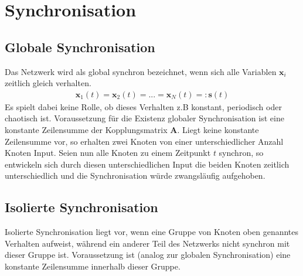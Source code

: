 \section{Synchronisation}
\subsection*{Globale Synchronisation}
Das Netzwerk wird als global synchron bezeichnet, wenn sich alle Variablen $\boldsymbol{x}_i$ zeitlich gleich verhalten.
\begin{align*}
\boldsymbol{x}_1(t)=\boldsymbol{x}_2(t)=...=\boldsymbol{x}_N(t)=:\boldsymbol{s}(t)
\end{align*}
Es spielt dabei keine Rolle, ob dieses Verhalten z.B konstant, periodisch oder chaotisch ist.
Voraussetzung für die Existenz globaler Synchronisation ist eine konstante Zeilensumme der Kopplungsmatrix $\boldsymbol{A}$. Liegt keine konstante Zeilensumme vor, so erhalten zwei Knoten von einer unterschiedlicher Anzahl Knoten Input. Seien nun alle Knoten zu einem Zeitpunkt $t$ synchron, so entwickeln sich durch diesen unterschiedlichen Input die beiden Knoten zeitlich unterschiedlich und die Synchronisation würde zwangsläufig aufgehoben.
\subsection*{Isolierte Synchronisation}
Isolierte Synchronisation liegt vor, wenn eine Gruppe von Knoten oben genanntes Verhalten aufweist, während ein anderer Teil des Netzwerks nicht synchron mit dieser Gruppe ist. Voraussetzung ist (analog zur globalen Synchronisation) eine konstante Zeilensumme innerhalb dieser Gruppe.

